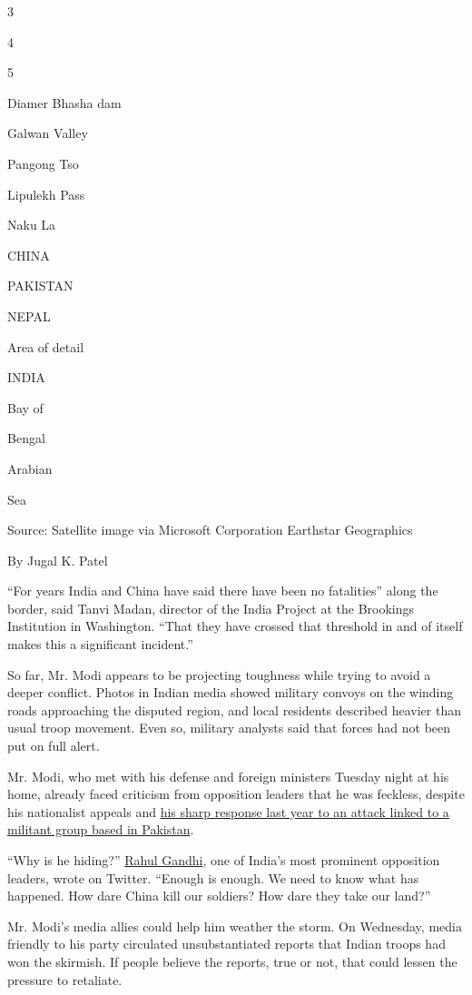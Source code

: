 3

4

5

Diamer Bhasha dam

Galwan Valley

Pangong Tso

Lipulekh Pass

Naku La

CHINA

PAKISTAN

NEPAL

Area of detail

INDIA

Bay of

Bengal

Arabian

Sea

Source: Satellite image via Microsoft Corporation Earthstar Geographics

By Jugal K. Patel

``For years India and China have said there have been no fatalities''
along the border, said Tanvi Madan, director of the India Project at the
Brookings Institution in Washington. ``That they have crossed that
threshold in and of itself makes this a significant incident.''

So far, Mr. Modi appears to be projecting toughness while trying to
avoid a deeper conflict. Photos in Indian media showed military convoys
on the winding roads approaching the disputed region, and local
residents described heavier than usual troop movement. Even so, military
analysts said that forces had not been put on full alert.

Mr. Modi, who met with his defense and foreign ministers Tuesday night
at his home, already faced criticism from opposition leaders that he was
feckless, despite his nationalist appeals and
\href{https://www.nytimes.com/2019/02/25/world/asia/india-pakistan-kashmir-jets.html}{his
sharp response last year to an attack linked to a militant group based
in Pakistan}.

``Why is he hiding?''
\href{https://twitter.com/RahulGandhi/status/1273094280307867648}{Rahul
Gandhi}, one of India's most prominent opposition leaders, wrote on
Twitter. ``Enough is enough. We need to know what has happened. How dare
China kill our soldiers? How dare they take our land?''

Mr. Modi's media allies could help him weather the storm. On Wednesday,
media friendly to his party circulated unsubstantiated reports that
Indian troops had won the skirmish. If people believe the reports, true
or not, that could lessen the pressure to retaliate.

